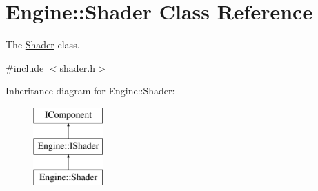 \hypertarget{classEngine_1_1Shader}{}\section{Engine\+:\+:Shader Class Reference}
\label{classEngine_1_1Shader}


The \hyperlink{classEngine_1_1Shader}{Shader} class.  




{\ttfamily \#include $<$shader.\+h$>$}

Inheritance diagram for Engine\+:\+:Shader\+:\begin{figure}[H]
\begin{center}
\leavevmode
\includegraphics[height=3.000000cm]{classEngine_1_1Shader}
\end{center}
\end{figure}
